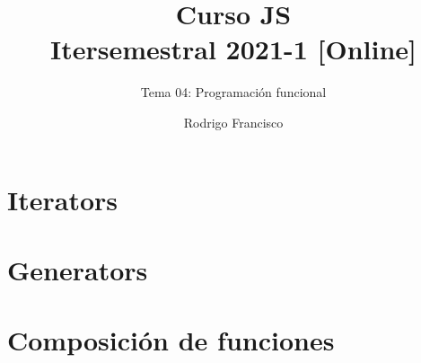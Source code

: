 \documentclass[aspectratio=169]{beamer}
\title{Curso JS \\ Itersemestral 2021-1 [Online]} %
\subtitle{Tema 04: Programación funcional} %
\author{
  Rodrigo Francisco \\
}
\begin{document}
  \shorthandoff{-}
  \frame[c]{\maketitle}


  \begin{darkframes}
    \section{Iterators}
    \section{Generators}
    \section{Composición de funciones}
   
  \end{darkframes}
\end{document}
